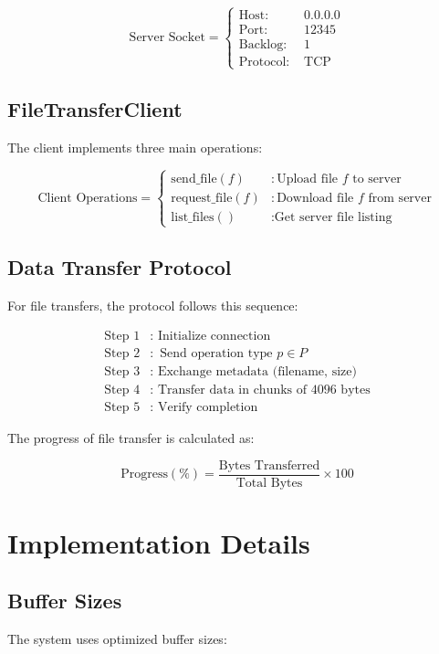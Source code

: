 \documentclass{article}
\begin{document}
\[
\text{Server Socket} = \begin{cases}
\text{Host: } & 0.0.0.0 \\
\text{Port: } & 12345 \\
\text{Backlog: } & 1 \\
\text{Protocol: } & \text{TCP}
\end{cases}
\]

\subsection{FileTransferClient}
The client implements three main operations:

\[
\text{Client Operations} = \begin{cases}
\text{send\_file}(f) & : \text{Upload file } f \text{ to server} \\
\text{request\_file}(f) & : \text{Download file } f \text{ from server} \\
\text{list\_files}() & : \text{Get server file listing}
\end{cases}
\]

\subsection{Data Transfer Protocol}
For file transfers, the protocol follows this sequence:

\begin{align*}
\text{Step 1} &: \text{ Initialize connection} \\
\text{Step 2} &: \text{ Send operation type } p \in P \\
\text{Step 3} &: \text{ Exchange metadata (filename, size)} \\
\text{Step 4} &: \text{ Transfer data in chunks of 4096 bytes} \\
\text{Step 5} &: \text{ Verify completion}
\end{align*}

The progress of file transfer is calculated as:

\[
\text{Progress}(\%) = \frac{\text{Bytes Transferred}}{\text{Total Bytes}} \times 100
\]

\section{Implementation Details}

\subsection{Buffer Sizes}
The system uses optimized buffer sizes:
\end{document}
